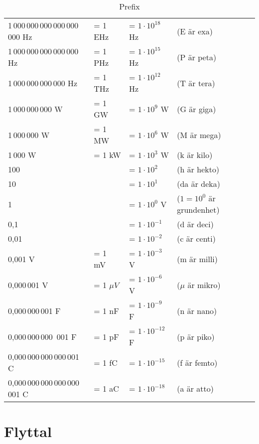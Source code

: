   \begin{table*}[ht]
    \begin{center}
      \begin{tabular}{|llll|}
        \hline
        1\,000\,000\,000\,000\,000\,000 Hz & = 1 EHz & = \(1 \cdot 10^{18}\) Hz & (E är exa) \\
        1\,000\,000\,000\,000\,000 Hz & = 1 PHz & = \(1 \cdot 10^{15}\) Hz & (P är peta) \\
        1\,000\,000\,000\,000 Hz & = 1 THz & = \(1 \cdot 10^{12}\) Hz & (T är tera) \\
        1\,000\,000\,000 W & = 1 GW & = \(1 \cdot 10^9\) W & (G är giga) \\
        1\,000\,000 W & = 1 MW & = \(1 \cdot 10^6\) W & (M är mega) \\
        1\,000 W & = 1 kW & = \(1 \cdot 10^3\) W & (k är kilo) \\
        100 & & = \(1 \cdot 10^2\) & (h är hekto) \\
        10 & & = \(1 \cdot 10^1\) & (da är deka) \\
        1 & & = \(1 \cdot 10^0\) V & (\(1 = 10^0\) är grundenhet) \\
        0,1 & & = \(1 \cdot 10^{-1}\) & (d är deci) \\
        0,01 & & = \(1 \cdot 10^{-2}\) & (c är centi) \\
        0,001 V & = 1 mV & = \(1 \cdot 10^{-3}\) V & (m är milli) \\
        0,000\,001 V & = 1 \(\mu V\) & = \(1 \cdot 10^{-6}\) V & (\(\mu \) är mikro) \\
        0,000\,000\,001 F & = 1 nF & = \(1 \cdot 10^{-9}\) F & (n är nano) \\
        0,000\,000\,000\, 001 F & = 1 pF & = \(1 \cdot 10^{-12}\) F & (p är piko) \\
        0,000\,000\,000\,000\,001 C & = 1 fC & = \(1 \cdot 10^{-15}\) & (f är femto) \\
        0,000\,000\,000\,000\,000\, 001 C & = 1 aC & = \(1 \cdot 10^{-18}\) & (a är atto) \\
        \hline
      \end{tabular}
    \end{center}
      \caption{Prefix}
      \label{tab:prefix}
\end{table*}


\section{Flyttal}

